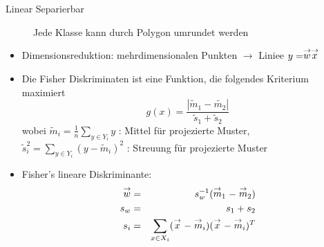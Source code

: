 \begin{description}
	\item[Linear Separierbar] Jede Klasse kann durch Polygon umrundet werden
\end{description}
\begin{itemize}
\item Dimensionsreduktion: mehrdimensionalen Punkten $\to$ Liniee $y = \stackrel{\to}{w} \stackrel{\to}{x}$
\item Die Fisher Diskriminaten ist eine Funktion, die folgendes Kriterium maximiert $$g(x) = \frac{| \tilde{m}_1 - \tilde{m_2}|}{\tilde{s}_1 + \tilde{s}_2}$$
wobei $\tilde{m}_i = \frac{1}{n} \sum\limits_{y \in Y_i} y$ : Mittel für projezierte Muster, $\tilde{s}_i^2 = \sum\limits_{y \in Y_i} (y - \tilde{m}_i)^2$ : Streuung für projezierte Muster
\item Fisher's lineare Diskriminante:
\begin{eqnarray*}
\stackrel{\to}{w} &=& s_w^{-1} (\stackrel{\to}{m}_1 - \stackrel{\to}{m}_2) \\ s_w &=& s_1 + s_2 \\ s_i &=& \sum\limits_{x \in X_i} (\stackrel{\to}{x} - \stackrel{\to}{m}_i)(\stackrel{\to}{x} - \stackrel{\to}{m}_i)^T
\end{eqnarray*}


\end{itemize}







